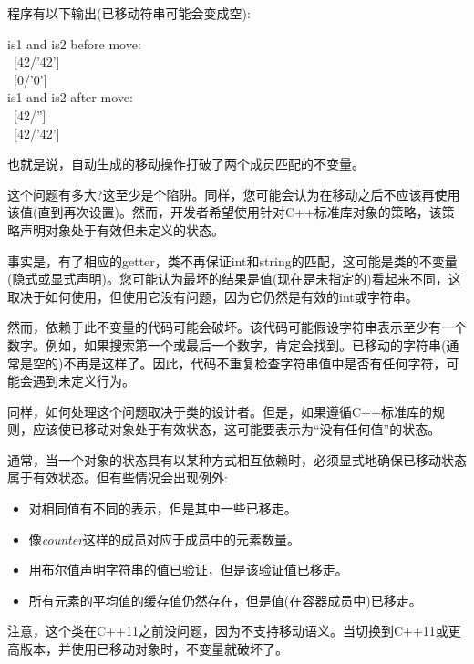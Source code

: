 程序有以下输出(已移动符串可能会变成空):\par

\begin{myOutput}
is1 and is2 before move: \\
\ [42/'42'] \\
\ [0/'0'] \\
is1 and is2 after move: \\
\ [42/''] \\
\ [42/'42']
\end{myOutput}

也就是说，自动生成的移动操作打破了两个成员匹配的不变量。\par

这个问题有多大?这至少是个陷阱。同样，您可能会认为在移动之后不应该再使用该值(直到再次设置)。然而，开发者希望使用针对C++标准库对象的策略，该策略声明对象处于有效但未定义的状态。\par

事实是，有了相应的getter，类不再保证int和string的匹配，这可能是类的不变量(隐式或显式声明)。您可能认为最坏的结果是值(现在是未指定的)看起来不同，这取决于如何使用，但使用它没有问题，因为它仍然是有效的int或字符串。\par

然而，依赖于此不变量的代码可能会破坏。该代码可能假设字符串表示至少有一个数字。例如，如果搜索第一个或最后一个数字，肯定会找到。已移动的字符串(通常是空的)不再是这样了。因此，代码不重复检查字符串值中是否有任何字符，可能会遇到未定义行为。\par

同样，如何处理这个问题取决于类的设计者。但是，如果遵循C++标准库的规则，应该使已移动对象处于有效状态，这可能要表示为“没有任何值”的状态。\par

通常，当一个对象的状态具有以某种方式相互依赖时，必须显式地确保已移动状态属于有效状态。但有些情况会出现例外:\par

\begin{itemize}
  \item 对相同值有不同的表示，但是其中一些已移走。
  \item 像\textit{counter}这样的成员对应于成员中的元素数量。
  \item 用布尔值声明字符串的值已验证，但是该验证值已移走。
  \item 所有元素的平均值的缓存值仍然存在，但是值(在容器成员中)已移走。
\end{itemize}

注意，这个类在C++11之前没问题，因为不支持移动语义。当切换到C++11或更高版本，并使用已移动对象时，不变量就破坏了。\par

